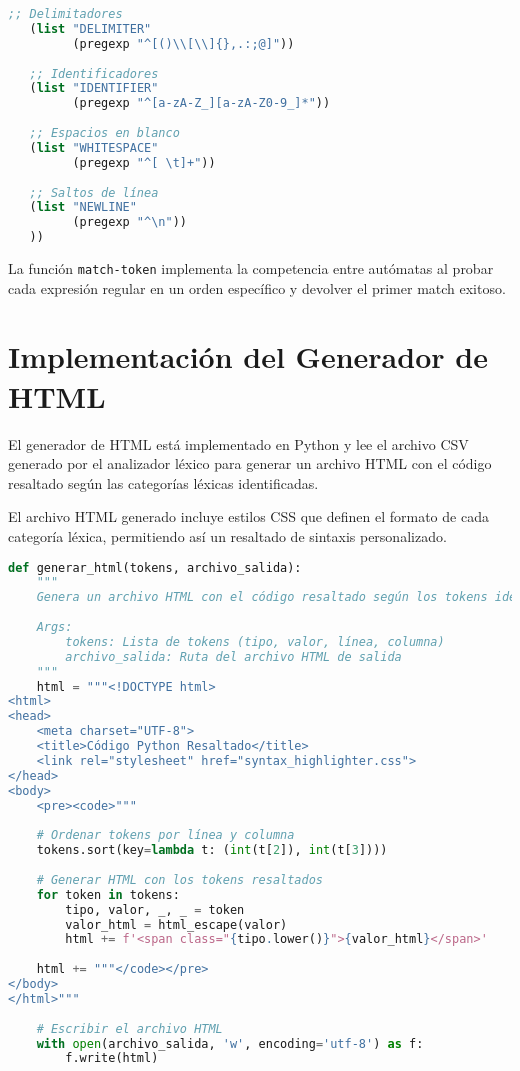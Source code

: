 \documentclass[12pt,letterpaper]{report}
\begin{document}
\begin{lstlisting}[language=Lisp]
   ;; Delimitadores
   (list "DELIMITER" 
         (pregexp "^[()\\[\\]{},.:;@]"))
   
   ;; Identificadores
   (list "IDENTIFIER" 
         (pregexp "^[a-zA-Z_][a-zA-Z0-9_]*"))
   
   ;; Espacios en blanco
   (list "WHITESPACE" 
         (pregexp "^[ \t]+"))
   
   ;; Saltos de línea
   (list "NEWLINE" 
         (pregexp "^\n"))
   ))
\end{lstlisting}

La función \texttt{match-token} implementa la competencia entre autómatas al probar cada expresión regular en un orden específico y devolver el primer match exitoso.

\section{Implementación del Generador de HTML}

El generador de HTML está implementado en Python y lee el archivo CSV generado por el analizador léxico para generar un archivo HTML con el código resaltado según las categorías léxicas identificadas.

El archivo HTML generado incluye estilos CSS que definen el formato de cada categoría léxica, permitiendo así un resaltado de sintaxis personalizado.

\begin{lstlisting}[language=Python]
def generar_html(tokens, archivo_salida):
    """
    Genera un archivo HTML con el código resaltado según los tokens identificados.
    
    Args:
        tokens: Lista de tokens (tipo, valor, línea, columna)
        archivo_salida: Ruta del archivo HTML de salida
    """
    html = """<!DOCTYPE html>
<html>
<head>
    <meta charset="UTF-8">
    <title>Código Python Resaltado</title>
    <link rel="stylesheet" href="syntax_highlighter.css">
</head>
<body>
    <pre><code>"""
    
    # Ordenar tokens por línea y columna
    tokens.sort(key=lambda t: (int(t[2]), int(t[3])))
    
    # Generar HTML con los tokens resaltados
    for token in tokens:
        tipo, valor, _, _ = token
        valor_html = html_escape(valor)
        html += f'<span class="{tipo.lower()}">{valor_html}</span>'
    
    html += """</code></pre>
</body>
</html>"""
    
    # Escribir el archivo HTML
    with open(archivo_salida, 'w', encoding='utf-8') as f:
        f.write(html)
\end{lstlisting}
\end{document}
